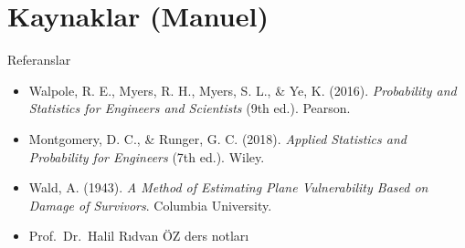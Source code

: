 % 
% 
% 

\section{Kaynaklar (Manuel)}

\begin{frame}{Referanslar}
    \begin{itemize}
        \item Walpole, R. E., Myers, R. H., Myers, S. L., \& Ye, K. (2016). \textit{Probability and Statistics for Engineers and Scientists} (9th ed.). Pearson.
        
        \item Montgomery, D. C., \& Runger, G. C. (2018). \textit{Applied Statistics and Probability for Engineers} (7th ed.). Wiley.
        
        \item Wald, A. (1943). \textit{A Method of Estimating Plane Vulnerability Based on Damage of Survivors}. Columbia University.
        
        \item Prof.\ Dr.~Halil Rıdvan ÖZ ders notları
    \end{itemize}
\end{frame}

